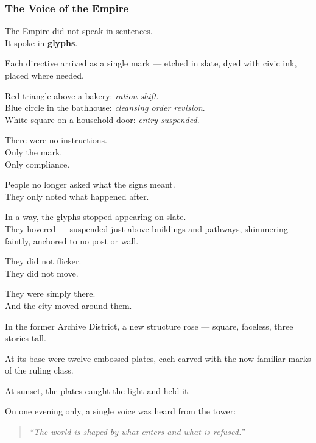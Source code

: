 \documentclass[12pt]{article}
\begin{document}
\dotfill

\subsubsection{The Voice of the Empire}

The Empire did not speak in sentences.\\
It spoke in \textbf{glyphs}.

Each directive arrived as a single mark — etched in slate, dyed with civic ink, placed where needed.

Red triangle above a bakery: \textit{ration shift}.\\
Blue circle in the bathhouse: \textit{cleansing order revision}.\\
White square on a household door: \textit{entry suspended}.

There were no instructions.\\
Only the mark.\\
Only compliance.

\vspace{1em}

People no longer asked what the signs meant.\\
They only noted what happened after.

\vspace{1em}

In a way, the glyphs stopped appearing on slate.\\
They hovered — suspended just above buildings and pathways, shimmering faintly, anchored to no post or wall.

They did not flicker.\\
They did not move.

They were simply there.\\
And the city moved around them.

\vspace{1em}

In the former Archive District, a new structure rose — square, faceless, three stories tall.

At its base were twelve embossed plates, each carved with the now-familiar marks of the ruling class.

At sunset, the plates caught the light and held it.

On one evening only, a single voice was heard from the tower:

\begin{quote}
\textit{“The world is shaped by what enters and what is refused.”}
\end{quote}
\end{document}
